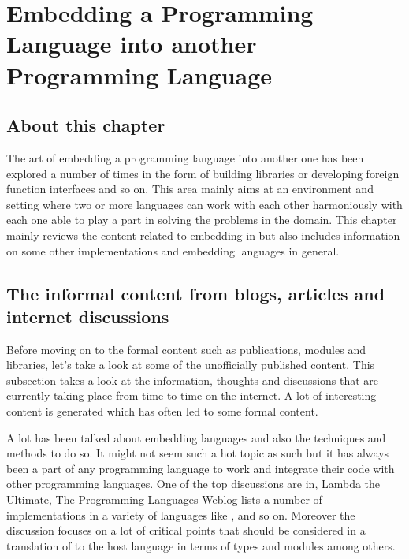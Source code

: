 \documentclass[thesis-solanki.tex]{subfiles}
\begin{document}
\chapter{Embedding a Programming Language into another Programming Language }\label{chap:embedding}


\section{About this chapter}

The art of embedding a programming language into another one has been explored a number of times in the form of
building libraries or developing foreign function interfaces and so on.
This area mainly aims at an environment and setting where two or more languages can work with each other
harmoniously with each one able to play a part in solving the problems in the domain.
This chapter mainly reviews the content related to embedding  in  but also
includes information on some other implementations and embedding languages in general.


\section{The informal content from blogs, articles and internet discussions}

Before moving on to the formal content such as publications, modules and libraries, let's take a look
at some of the unofficially published content.
This subsection takes a look at the information, thoughts and discussions that are currently taking place from time
to time on the internet.
A lot of interesting content is generated which has often led to some formal content.

A lot has been talked about embedding languages and also the techniques and methods to do so.
It might not seem such a hot topic as such but it has always been a part of any programming language to work and
integrate their code with other programming languages.
One of the top discussions are in, Lambda the Ultimate, The Programming Languages Weblog
\cite{website:lambda-the-ultimate} lists a number of  implementations in a variety of languages
like ,  \cite{racklog} and so on.
Moreover the discussion focuses on a lot of critical points that should be considered in a translation of
 to the host language in terms of types and modules among others.
\end{document}
